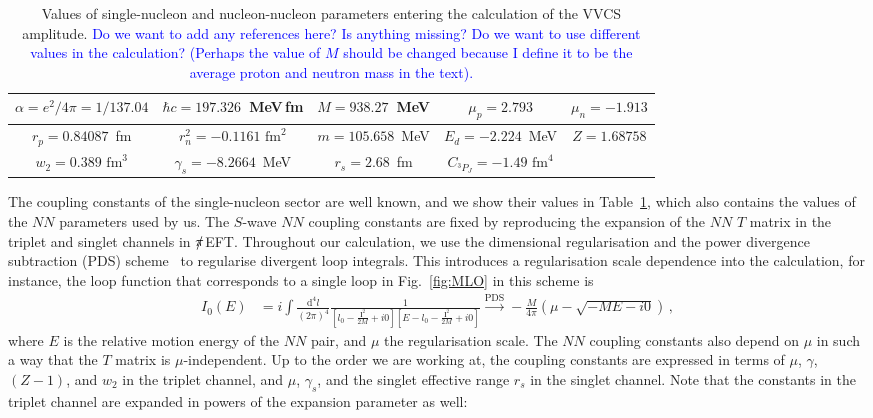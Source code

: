 \documentclass[prl,
twocolumn,
showpacs,preprintnumbers,amsmath,amssymb,
superscriptaddress,
a4paper,nofootinbib,longbibliography]{revtex4-2}
\def\bv#1{\boldsymbol{#1}}
\def\piEFT/{$\slashed{\pi}$EFT}
\begin{document}
\begin{table}[htb]
    \centering
    \begin{tabular}{c|c|c|c|c}
        $\alpha=e^2/4\pi=1/137.04$ & $\hbar c=197.326$~MeV\,fm & $M=938.27$~MeV &  $\mu_p=2.793$ & $\mu_n=-1.913$\\
         \hline 
        $r_p=0.84087$~fm & $r_n^2=-0.1161\text{ fm}^2$ & $m=105.658$~MeV & $E_d=-2.224$~MeV  & $Z=1.68758$\\
         \hline
         $w_2=0.389\text{ fm}^3$ & $\gamma_s=-8.2664$~MeV & $r_s=2.68$~fm & $C_{{}^{3\!}P_J}=-1.49\text{ fm}^4$
    \end{tabular}
    \caption{Values of single-nucleon and nucleon-nucleon parameters entering the calculation of the VVCS amplitude. \textcolor{blue}{Do we want to add any references here? Is anything missing? Do we want to use different values in the calculation? (Perhaps the value of $M$ should be changed because I define it to be the average proton and neutron mass in the text).}}
    \label{tab:couplings}
\end{table}
The coupling constants of the single-nucleon sector are well known, and we show their values in Table~\ref{tab:couplings}, which also contains the values of the $NN$ parameters used by us. The $S$-wave $NN$ coupling constants are fixed by reproducing the expansion of the $NN$ $T$ matrix in the triplet and singlet channels in \piEFT/. Throughout our calculation, we use the dimensional regularisation and the power divergence subtraction (PDS) scheme~\cite{Kaplan:1998tg,Kaplan:1998we} to regularise divergent loop integrals. This introduces a regularisation scale dependence into the calculation, for instance, the loop function that corresponds to a single loop in Fig.~\ref{fig:MLO} in this scheme is
\begin{align}
    I_0(E) & = i\int\frac{\mathrm{d}^4 l}{(2\pi)^4}\frac{1}{\left[l_0-\frac{\bv{l}^2}{2M}+i0\right]\left[E-l_0-\frac{\bv{l}^2}{2M}+i0\right]}\xrightarrow{\text{PDS}}
    -\frac{M}{4\pi}\left(\mu -\sqrt{-M E-i0}\right)\,,
\end{align}
where $E$ is the relative motion energy of the $NN$ pair, and $\mu$ the regularisation scale. The $NN$ coupling constants also depend on $\mu$ in such a way that the $T$ matrix is $\mu$-independent. Up to the order we are working at, the coupling constants are expressed in terms of $\mu$, $\gamma$, $(Z-1)$, and $w_2$ in the triplet channel, and $\mu$, $\gamma_s$, and the singlet effective range $r_s$ in the singlet channel. Note that the constants in the triplet channel are expanded in powers of the expansion parameter as well:
\end{document}
